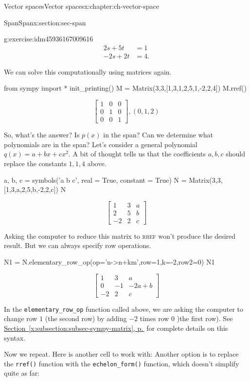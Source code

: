 \documentclass[oneside,10pt,]{book}
\newcommand{\xreffont}{\relax}
\newcommand{\mono}[1]{\texttt{#1}}
\newcommand{\initialism}[1]{\textsc{\MakeLowercase{#1}}}
\numberwithin{equation}{section}
\newcommand{\bbm}{\begin{bmatrix}}
\newcommand{\ebm}{\end{bmatrix}}
\newcommand{\amp}{&}
\begin{document}
\begin{chapterptx}{Vector spaces}{}{Vector spaces}{}{}{x:chapter:ch-vector-space}
\begin{sectionptx}{Span}{}{Span}{}{}{x:section:sec-span}
\begin{inlineexercise}{}{g:exercise:idm45936167009616}
\begin{align*}
2s+5t \amp =1\\
-2s+2t \amp =4\text{.}
\end{align*}
%
\par
We can solve this computationally using matrices again.%
\begin{sageinput}
from sympy import *
init_printing()
M = Matrix(3,3,[1,3,1,2,5,1,-2,2,4])
M.rref()
\end{sageinput}
\begin{sageoutput}
\[\bbm 1\amp 0\amp 0\\0\amp 1\amp 0\\0\amp 0\amp 1\ebm, (0,1,2)\]
\end{sageoutput}
So, what's the answer? Is \(p(x)\) in the span? Can we determine what polynomials are in the span? Let's consider a general polynomial \(q(x)=a+bx+cx^2\). A bit of thought tells us that the coefficients \(a,b,c\) should replace the constants \(1,1,4\) above.%
\begin{sageinput}
a, b, c = symbols('a b c', real = True, constant = True)
N = Matrix(3,3,[1,3,a,2,5,b,-2,2,c])
N
\end{sageinput}
\begin{sageoutput}
\[\bbm 1\amp 3\amp a\\2\amp 5\amp b\\-2\amp 2\amp c\ebm\]
\end{sageoutput}
Asking the computer to reduce this matrix to \initialism{RREF} won't produce the desired result. But we can always specify row operations.%
\begin{sageinput}
N1 = N.elementary_row_op(op='n->n+km',row=1,k=-2,row2=0)
N1
\end{sageinput}
\begin{sageoutput}
\[\bbm 1\amp 3\amp a\\0\amp -1\amp -2a+b\\-2\amp 2\amp c\ebm\]
\end{sageoutput}
In the \mono{elementary\_row\_op} function called above, we are asking the computer to change row \(1\) (the second row) by adding \(-2\) times row \(0\) )the first row). See \hyperref[x:subsection:subsec-sympy-matrix]{Section~{\xreffont\ref{x:subsection:subsec-sympy-matrix}}, p.\,\pageref{x:subsection:subsec-sympy-matrix}} for complete details on this syntax.%
\par
Now we repeat. Here is another cell to work with:%
Another option is to replace the \mono{rref()} function with the \mono{echelon\_form()} function, which doesn't simplify quite as far:%
\begin{sageinput}

\end{sageinput}
\end{inlineexercise}
\end{sectionptx}
\end{chapterptx}
\end{document}

